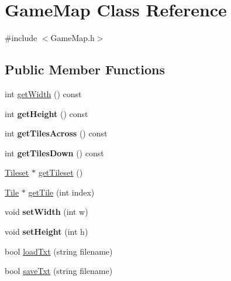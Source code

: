 \hypertarget{class_game_map}{}\section{Game\+Map Class Reference}
\label{class_game_map}


{\ttfamily \#include $<$Game\+Map.\+h$>$}

\subsection*{Public Member Functions}
\begin{DoxyCompactItemize}
\item 
int \hyperlink{class_game_map_a1f393e9009820a23ac1e0ad2c8626d97}{get\+Width} () const 
\item 
\hypertarget{class_game_map_af2364f9ff14b927f34ee56e1fa415f7b}{}int {\bfseries get\+Height} () const \label{class_game_map_af2364f9ff14b927f34ee56e1fa415f7b}

\item 
\hypertarget{class_game_map_a2574b6d012255d7ef5e24a67563568f5}{}int {\bfseries get\+Tiles\+Across} () const \label{class_game_map_a2574b6d012255d7ef5e24a67563568f5}

\item 
\hypertarget{class_game_map_aa46a078820c590f35406e83992d8f276}{}int {\bfseries get\+Tiles\+Down} () const \label{class_game_map_aa46a078820c590f35406e83992d8f276}

\item 
\hyperlink{class_tileset}{Tileset} $\ast$ \hyperlink{class_game_map_a2923a06a137d06f1d3fb809125a0809a}{get\+Tileset} ()
\item 
\hyperlink{class_tile}{Tile} $\ast$ \hyperlink{class_game_map_a9f86cbac8b3b53c06fc6955ec6b5b812}{get\+Tile} (int index)
\item 
\hypertarget{class_game_map_a5001c2991d82e37ab00483189aa1f11c}{}void {\bfseries set\+Width} (int w)\label{class_game_map_a5001c2991d82e37ab00483189aa1f11c}

\item 
\hypertarget{class_game_map_aa494ccc1f0235cadf5d2268cae4d3995}{}void {\bfseries set\+Height} (int h)\label{class_game_map_aa494ccc1f0235cadf5d2268cae4d3995}

\item 
bool \hyperlink{class_game_map_a65748ed7200ba15543c631f974c94ae7}{load\+Txt} (string filename)
\item 
bool \hyperlink{class_game_map_acfc2a16e2f01a6a254ba4df760686e9e}{save\+Txt} (string filename)
\end{DoxyCompactItemize}



